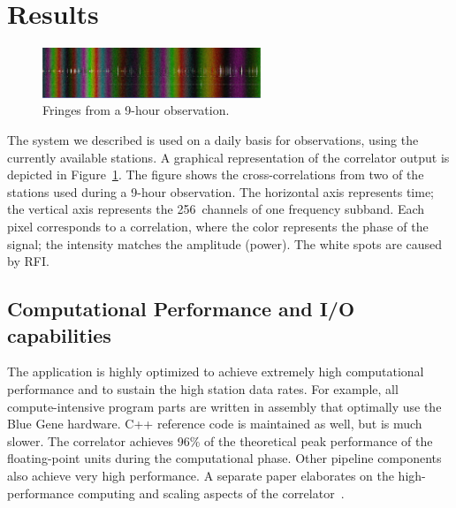 \section{Results}
\label{sec:results}

\begin{figure}[ht]
\includegraphics[width=\columnwidth,height=15mm]{fringe.jpg}
\caption{Fringes from a 9-hour observation.}
\label{fig:fringe}
\end{figure}

The system we described is used on a daily basis for observations, using the
currently available stations.
A graphical representation of the correlator output is depicted in
Figure~\ref{fig:fringe}.
The figure shows the cross-correlations from two of the stations used during a
9-hour observation.
The horizontal axis represents time;
the vertical axis represents the 256~channels of one frequency subband.
Each pixel corresponds to a correlation, where the color represents
the phase of the signal; the intensity matches the amplitude (power).
The white spots are caused by RFI.


\subsection{Computational Performance and I/O capabilities}

The application is highly optimized to achieve extremely high computational
performance and to sustain the high station data rates.
For example, all compute-intensive program parts are written in assembly
that optimally use the Blue Gene hardware.
C++ reference code is maintained as well, but is much slower.
The correlator achieves 96\% of the theoretical peak performance
of the floating-point units during the computational phase.
Other pipeline components also achieve very high performance.
A separate paper elaborates on the high-performance computing and scaling
aspects of the correlator~\cite{Romein:10a}.

